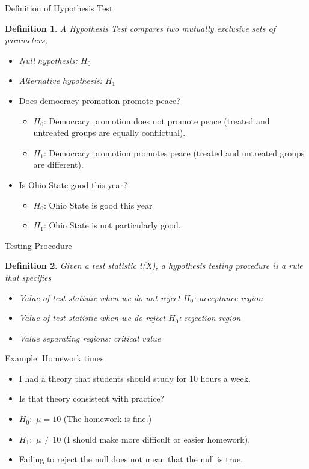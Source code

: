 \documentclass{beamer}
\newtheorem{defn}{Definition}
\numberwithin{equation}{section}
\begin{document}
\begin{frame}{Definition of Hypothesis Test}
\begin{defn}
A \alert{Hypothesis Test} compares two mutually exclusive sets of parameters,
\begin{itemize}
\item Null hypothesis: $H_0$
\item Alternative hypothesis: $H_1$
\end{itemize}
\end{defn}\pause
\begin{itemize}
\item Does democracy promotion promote peace? \pause
\begin{itemize}
\item $H_0$: Democracy promotion does not promote peace (treated and untreated groups are equally conflictual).
\item $H_1$: Democracy promotion promotes peace (treated and untreated groups are different).
\end{itemize}
\item Is Ohio State good this year?
\begin{itemize}
\item $H_0$: Ohio State is good this year
\item $H_1$: Ohio State is not particularly good.
\end{itemize}
\end{itemize}
\end{frame}

\begin{frame}{Testing Procedure}
\begin{defn}
Given a test statistic t(X), a hypothesis testing procedure is a rule that specifies
\begin{itemize}
\item Value of test statistic when we do not reject $H_0$: acceptance region\pause
\item Value of test statistic when we do reject $H_0$: rejection region\pause
\item Value separating regions: critical value
\end{itemize}
\end{defn}
\end{frame}

\begin{frame}{Example: Homework times }
\begin{itemize}
\item I had a theory that students should study for 10 hours a week.\pause
\item Is that theory consistent with practice?\pause
\item $H_0:$ $\mu =10$ (The homework is fine.)\pause
\item $H_1:$ $\mu \neq 10$  (I should make more difficult or easier homework).
\item Failing to reject the null does not mean that the null is true.
\end{itemize}
\end{frame}
\end{document}
